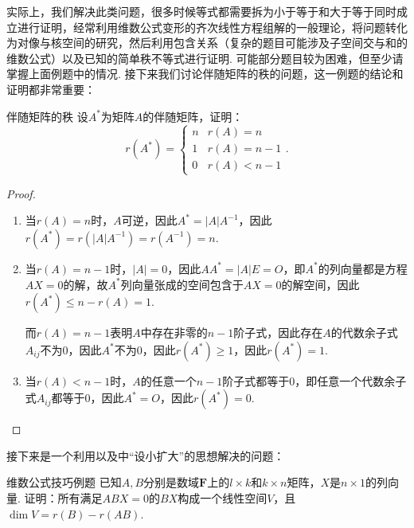 实际上，我们解决此类问题，很多时候等式都需要拆为小于等于和大于等于同时成立进行证明，经常利用维数公式变形的齐次线性方程组解的一般理论，将问题转化为对像与核空间的研究，然后利用包含关系（复杂的题目可能涉及子空间交与和的维数公式）以及已知的简单秩不等式进行证明. 可能部分题目较为困难，但至少请掌握上面例题中的情况. 接下来我们讨论伴随矩阵的秩的问题，这一例题的结论和证明都非常重要：
\begin{example}{}{伴随矩阵的秩}
    设$A^*$为矩阵$A$的伴随矩阵，证明：
    \[r(A^*)=\begin{cases}
            n & r(A)=n \\ 1 & r(A)=n-1 \\ 0 & r(A) < n-1
        \end{cases}.\]
\end{example}

\begin{proof}
    \begin{enumerate}
        \item 当$r(A)=n$时，$A$可逆，因此$A^*=|A|A^{-1}$，因此$r(A^*)=r(|A|A^{-1})=r(A^{-1})=n$.

        \item 当$r(A)=n-1$时，$|A|=0$，因此$AA^*=|A|E=O$，即$A^*$的列向量都是方程$AX=0$的解，故$A^*$列向量张成的空间包含于$AX=0$的解空间，因此$r(A^*)\leqslant n-r(A)=1$.

              而$r(A)=n-1$表明$A$中存在非零的$n-1$阶子式，因此存在$A$的代数余子式$A_{ij}$不为0，因此$A^*$不为0，因此$r(A^*)\geqslant 1$，因此$r(A^*)=1$.

        \item 当$r(A)<n-1$时，$A$的任意一个$n-1$阶子式都等于0，即任意一个代数余子式$A_{ij}$都等于0，因此$A^*=O$，因此$r(A^*)=0$.
    \end{enumerate}
\end{proof}

接下来是一个利用以及中``设小扩大''的思想解决的问题：
\begin{example}{}{维数公式技巧例题}
    已知$A,B$分别是数域$\mathbf{F}$上的$l \times k$和$k \times n$矩阵，$X$是$n \times 1$的列向量. 证明：所有满足$ABX=0$的$BX$构成一个线性空间$V$，且$\dim V = r(B) - r(AB)$.
\end{example}

